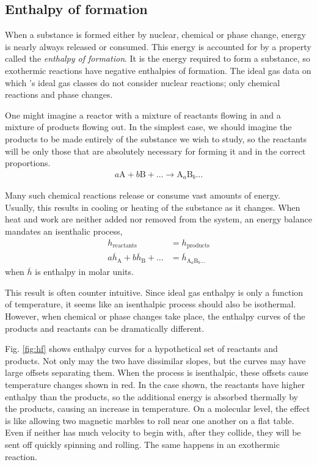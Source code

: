 \subsection{Enthalpy of formation}\label{sec:hf}

When a substance is formed either by nuclear, chemical or phase change, energy is nearly always released or consumed.  This energy is accounted for by a property called the \emph{enthalpy of formation}.  It is the energy required to form a substance, so exothermic reactions have negative enthalpies of formation.  The ideal gas data on which \PM's ideal gas classes do not consider nuclear reactions; only chemical reactions and phase changes.  

One might imagine a reactor with a mixture of reactants flowing in and a mixture of products flowing out.  In the simplest case, we should imagine the products to be made entirely of the substance we wish to study, so the reactants will be only those that are absolutely necessary for forming it and in the correct proportions.
\begin{align}
a \mathrm{A}+ b \mathrm{B} + \ldots \rightarrow \mathrm{A}_a \mathrm{B}_b \ldots
\end{align}

Many such chemical reactions release or consume vast amounts of energy.  Usually, this results in cooling or heating of the substance as it changes.  When heat and work are neither added nor removed from the system, an energy balance mandates an isenthalic process,
\begin{align}
h_\mathrm{reactants} &= h_\mathrm{products}\nonumber\\
a \overline{h}_\mathrm{A} + b \overline{h}_\mathrm{B} + \ldots &= \overline{h}_{\mathrm{A}_a \mathrm{B}_b \ldots}
\end{align}
when $\overline{h}$ is enthalpy in molar units.

This result is often counter intuitive.  Since ideal gas enthalpy is only a function of temperature, it seems like an isenthalpic process should also be isothermal.  However, when chemical or phase changes take place, the enthalpy curves of the products and reactants can be dramatically different.  

Fig. \ref{fig:hf} shows enthalpy curves for a hypothetical set of reactants and products.  Not only may the two have dissimilar slopes, but the curves may have large offsets separating them.  When the process is isenthalpic, these offsets cause temperature changes shown in red.  In the case shown, the reactants have higher enthalpy than the products, so the additional energy is absorbed thermally by the products, causing an increase in temperature.  On a molecular level, the effect is like allowing two magnetic marbles to roll near one another on a flat table.  Even if neither has much velocity to begin with, after they collide, they will be sent off quickly spinning and rolling.  The same happens in an exothermic reaction.

